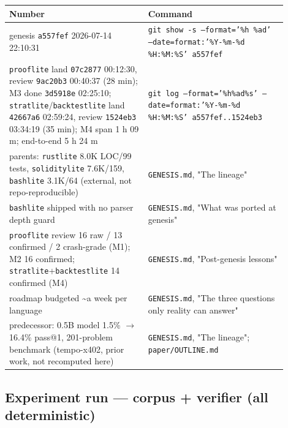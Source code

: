 \documentclass[11pt]{article}
\newcommand{\code}[1]{\texttt{#1}}
\begin{document}
\begingroup\small
\begin{longtable}{p{0.450\linewidth} p{0.450\linewidth}}
\toprule
\textbf{Number} & \textbf{Command} \\
\midrule\endhead
genesis \code{a557fef} 2026-07-14 22:10:31 & \code{git show -s --format='\%h \%ad' --date=format:'\%Y-\%m-\%d \%H:\%M:\%S' a557fef} \\
\code{prooflite} land \code{07c2877} 00:12:30, review \code{9ac20b3} 00:40:37 (28 min); M3 done \code{3d5918e} 02:25:10; \code{stratlite}/\code{backtestlite} land \code{42667a6} 02:59:24, review \code{1524eb3} 03:34:19 (35 min); M4 span 1 h 09 m; end-to-end 5 h 24 m & \code{git log --format='\%h\textbar{}\%ad\textbar{}\%s' --date=format:'\%Y-\%m-\%d \%H:\%M:\%S' a557fef..1524eb3} \\
parents: \code{rustlite} 8.0K LOC/99 tests, \code{soliditylite} 7.6K/159, \code{bashlite} 3.1K/64 (external, not repo-reproducible) & \code{GENESIS.md}, "The lineage" \\
\code{bashlite} shipped with no parser depth guard & \code{GENESIS.md}, "What was ported at genesis" \\
\code{prooflite} review 16 raw / 13 confirmed / 2 crash-grade (M1); M2 16 confirmed; \code{stratlite}+\code{backtestlite} 14 confirmed (M4) & \code{GENESIS.md}, "Post-genesis lessons" \\
roadmap budgeted \textasciitilde{}a week per language & \code{GENESIS.md}, "The three questions only reality can answer" \\
predecessor: 0.5B model 1.5\% $\rightarrow$ 16.4\% pass@1, 201-problem benchmark (tempo-x402, prior work, not recomputed here) & \code{GENESIS.md}, "The lineage"; \code{paper/OUTLINE.md} \\
\bottomrule
\end{longtable}\endgroup

\subsection*{Experiment run --- corpus + verifier (all deterministic)}
\end{document}
